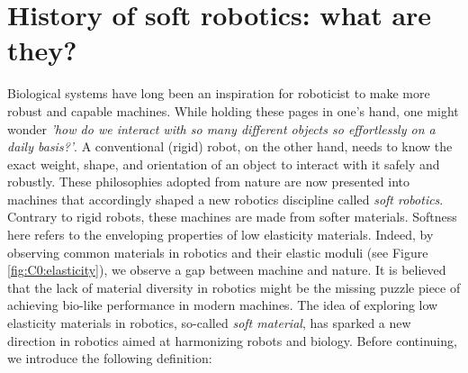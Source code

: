 \section{History of soft robotics: what are they?} 
\label{sec:intro:history}
Biological systems have long been an inspiration for roboticist to make more robust and capable machines. While holding these pages in one's hand, one might wonder \textit{'how do we interact with so many different objects so effortlessly on a daily basis?'}. A conventional (rigid) robot, on the other hand, needs to know the exact weight, shape, and orientation of an object to interact with it safely and robustly. These philosophies adopted from nature are now presented into machines that accordingly shaped a new robotics discipline called \emph{soft robotics}. Contrary to rigid robots, these machines are made from softer materials. Softness here refers to the enveloping properties of low elasticity materials. Indeed, by observing common materials in robotics and their elastic moduli (see Figure \ref{fig:C0:elasticity}), we observe a gap between machine and nature. It is believed that the lack of material diversity in robotics might be the missing puzzle piece of achieving bio-like performance in modern machines.
The idea of exploring low elasticity materials in robotics, so-called \textit{soft material}, has sparked a new direction in robotics aimed at harmonizing robots and biology. Before continuing, we introduce the following definition:
%
\
